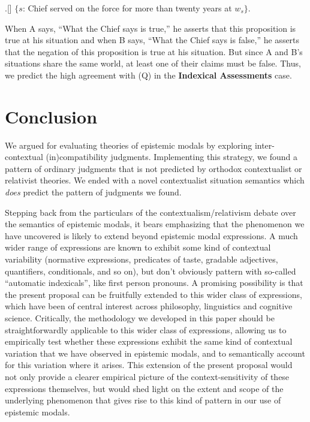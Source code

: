 \documentclass[11pt]{article}
\begin{document}
\begin{doublespace}

\ex.[] $\{s$: Chief served on the force for more than twenty years at $w_s\}$. 

When A says, ``What the Chief says is true,'' he asserts that this proposition is true at his situation and when B says,  ``What the Chief says is false,'' he asserts that the negation of this proposition is true at his situation. But since A and B's situations share the same world, at least one of their claims must be false. Thus, we predict the high agreement with (Q) in the {\bf Indexical Assessments} case.

\section{Conclusion}

We argued for evaluating theories of epistemic modals by exploring inter-contextual (in)compatibility judgments. Implementing this strategy, we found a pattern of ordinary judgments that is not predicted by orthodox contextualist or relativist theories. We ended with a novel contextualist situation semantics which {\it does} predict the pattern of judgments we found. 

Stepping back from the particulars of the contextualism/relativism debate over the semantics of epistemic modals, it bears emphasizing that the phenomenon we have uncovered is likely to extend beyond epistemic modal expressions. A much wider range of expressions are known to exhibit some kind of contextual variability (normative expressions, predicates of taste, gradable adjectives, quantifiers, conditionals, and so on), but don't obviously pattern with so-called ``automatic indexicals'', like first person pronouns. A promising possibility is that the present proposal can be fruitfully extended to this wider class of expressions, which have been of central interest across philosophy, linguistics and cognitive science. Critically, the methodology we developed in this paper should be straightforwardly applicable to this wider class of expressions, allowing us to empirically test whether these expressions exhibit the same kind of contextual variation that we have observed in epistemic modals, and to semantically account for this variation where it arises. This extension of the present proposal would not only provide a clearer empirical picture of the context-sensitivity of these expressions themselves, but would shed light on the extent and scope of the underlying phenomenon that gives rise to this kind of pattern in our use of epistemic modals.


\end{doublespace}




%
\end{document}
